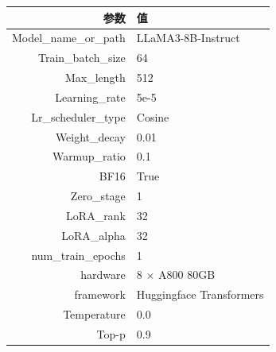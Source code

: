 \begin{table}[htbp]
\centering

\footnotesize
\begin{tabular}{|r|l|}
\hline
\textbf{参数} & \textbf{值} \\
\hline
Model\_name\_or\_path & LLaMA3-8B-Instruct \\
Train\_batch\_size & 64 \\
Max\_length & 512 \\
Learning\_rate & 5e-5 \\
Lr\_scheduler\_type & Cosine \\
Weight\_decay & 0.01 \\
Warmup\_ratio & 0.1 \\
BF16 & True \\
Zero\_stage & 1 \\
LoRA\_rank & 32 \\
LoRA\_alpha & 32 \\
num\_train\_epochs & 1 \\
hardware & 8 × A800 80GB \\
framework & Huggingface Transformers \\
Temperature & 0.0 \\
Top-p & 0.9 \\
\hline
\end{tabular}

\label{tab:method2-training_config}
\end{table}
